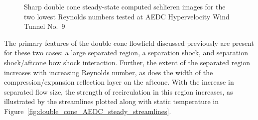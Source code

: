 \begin{figure}[hbtp]
\begin{center}
    \caption{Sharp double cone steady-state computed schlieren images for the two lowest Reynolds numbers tested at AEDC Hypervelocity Wind Tunnel No.~9\label{fig:double_cone_AEDC_steady_schlieren}}
  \end{center}
\end{figure}
The primary features of the double cone flowfield discussed previously are present for these two cases: a large separated region, a separation shock, and separation shock/aftcone bow shock interaction.  Further, the extent of the separated region increases with increasing Reynolds number, as does the width of the compression/expansion reflection layer on the aftcone. With the increase in separated flow size, the strength of recirculation in this region increases, as illustrated by the streamlines plotted along with static temperature in Figure~\ref{fig:double_cone_AEDC_steady_streamlines}.
